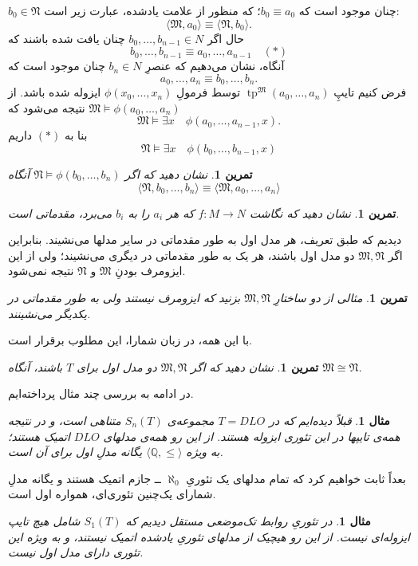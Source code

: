 \documentclass[12pt,a4paper]{report}
\theoremstyle{colorhead}
\newtheorem{tam}[thm]{تمرین}
\newtheorem{mesal}[thm]{مثال}
\DeclareMathOperator{\tp}{tp}
\begin{document}
$b_0\in \mathfrak{N}$
چنان موجود است که
$b_0\equiv a_0$؛
که منظور از علامت یادشده، عبارت زیر است:
\[
\langle \mathfrak{M},a_0\rangle\equiv \langle \mathfrak{N},b_0\rangle.
\]
حال اگر
$b_0,\ldots,b_{n-1}\in N$
چنان یافت شده باشند که
\[b_0,\ldots,b_{n-1}\equiv a_0,\ldots,a_{n-1}\quad (*)\] 
آنگاه، نشان می‌دهیم که عنصرِ
$b_n\in N$
چنان موجود است که
\[
a_0,\ldots,a_n\equiv b_0,\ldots,b_n.
\]
فرض کنیم تایپِ
$\tp^\mathfrak{M}(a_0,\ldots,a_n)$
توسط
فرمولِ
$\phi(x_0,\ldots,x_n)$
ایزوله شده باشد. از
\mbox{$\mathfrak{M}\models \phi(a_0,\ldots,a_n)$}
نتیجه می‌شود که
\[
\mathfrak{M}\models \exists x\quad \phi(a_0,\ldots,a_{n-1},x).\]
بنا به 
$(*)$
داریم
\[
\mathfrak{N}\models \exists x\quad \phi(b_0,\ldots,b_{n-1},x)\]
\begin{tam}
نشان دهید که اگر
$\mathfrak{N}\models \phi(b_0,\ldots,b_n)$
آنگاه 
\[
\langle \mathfrak{N}, b_0,\ldots,b_n\rangle\equiv \langle \mathfrak{M},a_0,\ldots,a_n\rangle\]
\end{tam}
\begin{tam}
نشان دهید که نگاشت
$f:M\to N$
که هر
$a_i$
را به
$b_i$
می‌برد، مقدماتی است. 
\end{tam}
دیدیم که طبق تعریف، هر مدل اول به طور مقدماتی در سایر مدلها می‌نشیند. بنابراین اگر
$\mathfrak{M},\mathfrak{N}$
دو مدل اول باشند، هر یک به طور مقدماتی در دیگری می‌نشیند؛ ولی از این ایزومرف بودنِ
$\mathfrak{M}$
و
$\mathfrak{N}$
نتیجه نمی‌شود.
\begin{tam}
مثالی از دو ساختارِ
$\mathfrak{
M},\mathfrak{N}$
بزنید که ایزومرف نیستند ولی به طور مقدماتی در یکدیگر می‌نشینند.
\end{tam}
با این همه، در زبان شمارا، این مطلوب برقرار است.
\begin{tam}
نشان دهید که اگر
$\mathfrak{M},\mathfrak{N}$
دو مدل اول برای
$T$
باشند، آنگاه
$\mathfrak{M}\cong \mathfrak{N}$.
\end{tam}
در ادامه به بررسی چند مثال پرداخته‌ایم. 
\begin{mesal}
قبلاً دیده‌ایم که در
$T=DLO$
مجموعه‌ی
$S_n(T)$
متناهی است، و در نتیجه همه‌ی تایپها در این تئوری ایزوله هستند. از این رو همه‌ی مدلهای
$DLO$
اتمیک هستند؛ به ویژه
$\langle\mathbb{Q},\leq\rangle$
یگانه مدلِ اول برای آن است. 
\end{mesal}
بعداً ثابت خواهیم کرد که تمام مدلهای یک تئوریِ
 $\aleph_0$ 
 ــ
جازم اتمیک هستند و یگانه مدلِ شمارای یک‌چنین تئوری‌ای، همواره اول است.
\begin{mesal}
در تئوریِ
روابط تک‌موضعی مستقل دیدیم که
$S_1(T)$
شامل هیچ تایپ ایزوله‌ای نیست. از این رو هیچیک از مدلهای تئوریِ یادشده اتمیک نیستند، و به ویژه این تئوری دارای مدل اول نیست.
\end{mesal}
\end{document}
